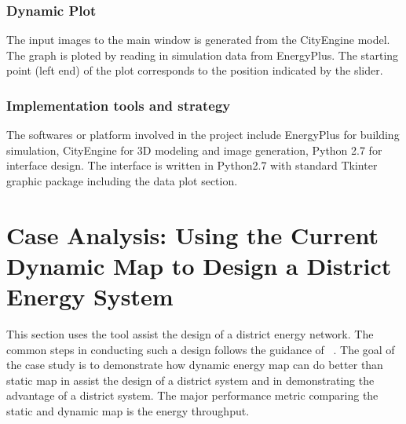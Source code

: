 \documentclass[hidelinks,12pt]{article}
\begin{document}
\subsubsection {Dynamic Plot}
The input images to the main window is generated from the CityEngine
model. The graph is ploted by reading in simulation data from
EnergyPlus. The starting point (left end) of the plot corresponds to
the position indicated by the slider. 

\subsubsection {Implementation tools and strategy}
The softwares or platform involved in the project include EnergyPlus
for building simulation, CityEngine for 3D modeling and image
generation, Python 2.7 for interface design. The interface is written
in Python2.7 with standard Tkinter graphic package including the data
plot section.

\section{Case Analysis: Using the Current Dynamic Map to Design a District Energy System}
This section uses the tool assist the design of a district energy
network. The common steps in conducting such a design follows the
guidance of ~\cite{IDEA2012}. The goal of the case study is to
demonstrate how dynamic energy map can do better than static map in
assist the design of a district system and in demonstrating the
advantage of a district system. The major performance metric comparing
the static and dynamic map is the energy throughput.

\begin{comment}
As is suggested in the document~\cite{IDEA2012}, the data needed for
designing a district system include: 1) existing and emerging thermal
energy consumption, 2) fuel source availability and 3) land use
constraint. For the current case analysis on the conceptual setting,
the energy consumption is restricted to the heating gas energy
consumption and cooling electricity energy for the existing buildings.
The assumption about the central plant is it uses natural gas to
produce electricity, as is the most common case. It can also produce
chilled water with absorption chiller in summer. For land use
constraint, we assume the pipeline can be put only under the road
network.
\end{comment}
 
\end{document}
